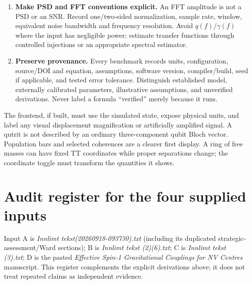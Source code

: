\documentclass[a4paper,11pt]{article}
\begin{document}
\begin{enumerate}
\item \textbf{Make PSD and FFT conventions explicit.} An FFT amplitude is not a PSD or an SNR. Record one/two-sided normalization, sample rate, window, equivalent noise bandwidth and frequency resolution. Avoid $q(f)/\gamma(f)$ where the input has negligible power; estimate transfer functions through controlled injections or an appropriate spectral estimator.
\item \textbf{Preserve provenance.} Every benchmark records units, configuration, source/DOI and equation, assumptions, software version, compiler/build, seed if applicable, and tested error tolerance. Distinguish established model, externally calibrated parameters, illustrative assumptions, and unverified derivations. Never label a formula ``verified'' merely because it runs.
\end{enumerate}

The frontend, if built, must use the simulated state, expose physical units, and label any visual displacement magnification or artificially amplified signal. A qutrit is not described by an ordinary three-component qubit Bloch vector. Population bars and selected coherences are a clearer first display. A ring of free masses can have fixed TT coordinates while proper separations change; the coordinate toggle must transform the quantities it shows.

\section{Audit register for the four supplied inputs}
\label{sec:register}

Input A is \emph{Innlimt tekst(20260918-093730).txt} (including its duplicated strategic-assessment/Ward sections); B is \emph{Innlimt tekst (2)(6).txt}; C is \emph{Innlimt tekst (3).txt}; D is the pasted \emph{Effective Spin-1 Gravitational Couplings for NV Centres} manuscript. This register complements the explicit derivations above; it does not treat repeated claims as independent evidence.
\end{document}
